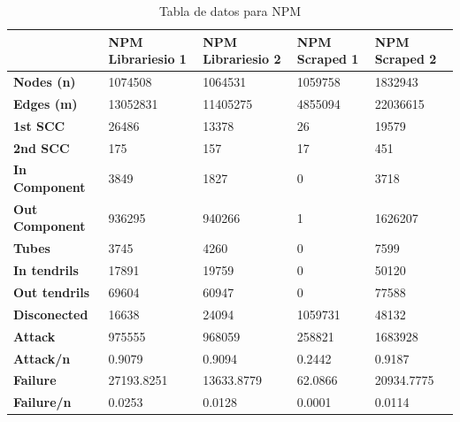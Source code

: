 \begin{table}[ht!]
    \centering
    \tiny
    \label{tab:data_npm}
    \begin{tabular}{|l|l|l|l|l|}
        \hline
                               & \textbf{NPM Librariesio 1} & \textbf{NPM Librariesio 2} & \textbf{NPM Scraped 1} & \textbf{NPM Scraped 2} \\
        \hline
        \textbf{Nodes (n)}     & 1074508                    & 1064531                    & 1059758                & 1832943                \\
        \textbf{Edges (m)}     & 13052831                   & 11405275                   & 4855094                & 22036615               \\
        \textbf{1st SCC}       & 26486                      & 13378                      & 26                     & 19579                  \\
        \textbf{2nd SCC}       & 175                        & 157                        & 17                     & 451                    \\
        \textbf{In Component}  & 3849                       & 1827                       & 0                      & 3718                   \\
        \textbf{Out Component} & 936295                     & 940266                     & 1                      & 1626207                \\
        \textbf{Tubes}         & 3745                       & 4260                       & 0                      & 7599                   \\
        \textbf{In tendrils}   & 17891                      & 19759                      & 0                      & 50120                  \\
        \textbf{Out tendrils}  & 69604                      & 60947                      & 0                      & 77588                  \\
        \textbf{Disconected}   & 16638                      & 24094                      & 1059731                & 48132                  \\
        \textbf{Attack}        & 975555                     & 968059                     & 258821                 & 1683928                \\
        \textbf{Attack/n}      & 0.9079                     & 0.9094                     & 0.2442                 & 0.9187                 \\
        \textbf{Failure}       & 27193.8251                 & 13633.8779                 & 62.0866                & 20934.7775             \\
        \textbf{Failure/n}     & 0.0253                     & 0.0128                     & 0.0001                 & 0.0114                 \\
        \hline
    \end{tabular}
    \caption{Tabla de datos para NPM}
\end{table}


